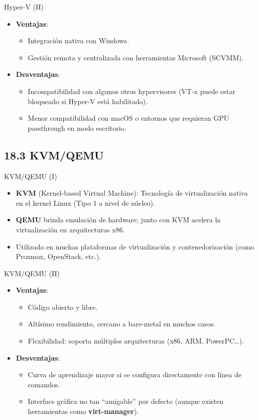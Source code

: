 \documentclass{beamer}
\begin{document}
\begin{frame}{Hyper-V (II)}
	\begin{itemize}
		\item \textbf{Ventajas}:
			\begin{itemize}
				\item Integración nativa con Windows.
				\item Gestión remota y centralizada con herramientas Microsoft (SCVMM).
			\end{itemize}
		\item \textbf{Desventajas}:
			\begin{itemize}
				\item Incompatibilidad con algunos otros hypervisores (VT-x puede estar bloqueado si Hyper-V está habilitado).
				\item Menor compatibilidad con macOS o entornos que requieran GPU passthrough en modo escritorio.
			\end{itemize}
	\end{itemize}
\end{frame}

\subsection{18.3 KVM/QEMU}
\begin{frame}{KVM/QEMU (I)}
	\begin{itemize}
		\item \textbf{KVM} (Kernel-based Virtual Machine): Tecnología de virtualización nativa en el kernel Linux (Tipo 1 a nivel de núcleo).
		\item \textbf{QEMU} brinda emulación de hardware; junto con KVM acelera la virtualización en arquitecturas x86.
		\item Utilizado en muchas plataformas de virtualización y contenedorización (como Proxmox, OpenStack, etc.).
	\end{itemize}
\end{frame}

\begin{frame}{KVM/QEMU (II)}
	\begin{itemize}
		\item \textbf{Ventajas}:
			\begin{itemize}
				\item Código abierto y libre.
				\item Altísimo rendimiento, cercano a bare-metal en muchos casos.
				\item Flexibilidad: soporta múltiples arquitecturas (x86, ARM, PowerPC…).
			\end{itemize}
		\item \textbf{Desventajas}:
			\begin{itemize}
				\item Curva de aprendizaje mayor si se configura directamente con línea de comandos.
				\item Interface gráfica no tan “amigable” por defecto (aunque existen herramientas como \textbf{virt-manager}).
			\end{itemize}
	\end{itemize}
\end{frame}
\end{document}
